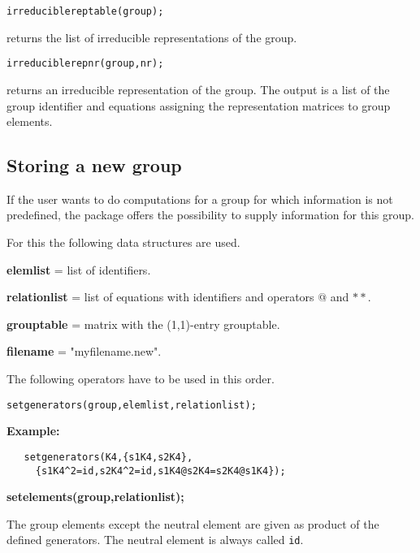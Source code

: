 \texttt{irreduciblereptable(group);}

returns the list of irreducible representations of the group.

\texttt{irreduciblerepnr(group,nr);}

returns an irreducible representation of the group. The output
is a list of the group identifier and equations
assigning the representation matrices to group elements.

\subsection{Storing a new group}
\hypertarget{operator:SETGENERATORS}{}
\hypertarget{operator:SETELEMENTS}{}
\hypertarget{operator:SETGROUPTABLE}{}
\hypertarget{operator:RSETREPRESENTATION}{}
\hypertarget{operator:CSETREPRESENTATION}{}
\hypertarget{operator:SETAVAILABLE}{}
\hypertarget{operator:STOREGROUP}{}
\hypertarget{operator:LOADGROUPS}{}

If the user wants to do computations for a group for which
information is not predefined,
the package  offers the possibility to supply information
for this group.

For this the following data structures are used.

\textbf{elemlist} = list of identifiers.

\textbf{relationlist}  = list of equations with identifiers and
operators $@$ and $**$.

\textbf{grouptable} = matrix with the (1,1)-entry grouptable.

\textbf{filename} = "myfilename.new".

\vspace{2cm}
The following operators have to be used in this order.

\texttt{setgenerators(group,elemlist,relationlist);}

\textbf{Example:}
\begin{verbatim}
   setgenerators(K4,{s1K4,s2K4},
     {s1K4^2=id,s2K4^2=id,s1K4@s2K4=s2K4@s1K4});
\end{verbatim}

\textbf{setelements(group,relationlist);}

The group elements except the neutral element
are given as product of the defined
generators. The neutral element is always called \texttt{id}.

